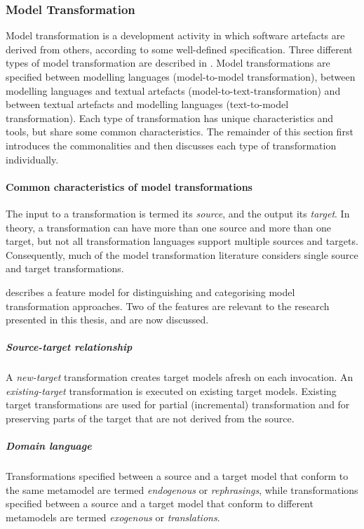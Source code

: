 \subsubsection{Model Transformation}
\label{subsubsec:model_transformation}
Model transformation is a development activity in which software artefacts are derived from others, according to some well-defined specification. Three different types of model transformation are described in \cite{kleppe03mda,kolovos09thesis}. Model transformations are specified between modelling languages (model-to-model transformation), between modelling languages and textual artefacts (model-to-text-transformation) and between textual artefacts and modelling languages (text-to-model transformation). Each type of transformation has unique characteristics and tools, but share some common characteristics. The remainder of this section first introduces the commonalities and then discusses each type of transformation individually.

\paragraph{Common characteristics of model transformations}
The input to a transformation is termed its \emph{source}, and the output its \emph{target}. In theory, a transformation can have more than one source and more than one target, but not all transformation languages support multiple sources and targets. Consequently, much of the model transformation literature considers single source and target transformations.

\cite{czarnecki06survey} describes a feature model for distinguishing and categorising model transformation approaches. Two of the features are relevant to the research presented in this thesis, and are now discussed. 

\subparagraph{Source-target relationship} A \emph{new-target} transformation creates target models afresh on each invocation. An \emph{existing-target} transformation is executed on existing target models. Existing target transformations are used for partial (incremental) transformation and for preserving parts of the target that are not derived from the source.

\subparagraph{Domain language} Transformations specified between a source and a target model that conform to the same metamodel are termed \emph{endogenous} or \emph{rephrasings}, while transformations specified between a source and a target model that conform to different metamodels are termed \emph{exogenous} or \emph{translations}.

